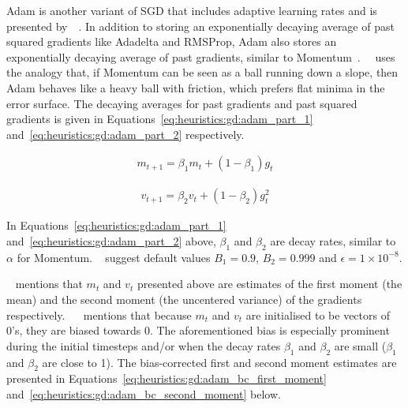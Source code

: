 \Acf{Adam} is another variant of \acs{SGD} that includes adaptive learning rates and is presented by~\citeauthor{ref:kingma:2014}~\cite{ref:kingma:2014}. In addition to storing an exponentially decaying average of past squared gradients like \acs{Adadelta} and \acs{RMSProp}, \acs{Adam} also stores an exponentially decaying average of past gradients, similar to \acs{Momentum}~\cite{ref:ruder:2016}.~\citeauthor{ref:heusel:2017}~\cite{ref:heusel:2017} uses the analogy that, if \acs{Momentum} can be seen as a ball running down a slope, then \acs{Adam} behaves like a heavy ball with friction, which prefers flat minima in the error surface. The decaying averages for past gradients and past squared gradients is given in Equations~\eqref{eq:heuristics:gd:adam_part_1} and~\eqref{eq:heuristics:gd:adam_part_2} respectively.

\begin{equation}
      \label{eq:heuristics:gd:adam_part_1}
      \begin{split}
            m_{t+1} = \beta_{1}m_{t} + (1 - \beta_{1})g_{t}
      \end{split}
\end{equation}

\begin{equation}
      \label{eq:heuristics:gd:adam_part_2}
      \begin{split}
            v_{t+1} = \beta_{2}v_{t} + (1 - \beta_{2})g^{2}_{t}
      \end{split}
\end{equation}

\noindent
In Equations~\eqref{eq:heuristics:gd:adam_part_1} and~\eqref{eq:heuristics:gd:adam_part_2} above, $\beta_{1}$ and $\beta_{2}$ are decay rates, similar to $\alpha$ for \acs{Momentum}. \citeauthor{ref:kingma:2014}~\cite{ref:kingma:2014} suggest default values $B_{1}=0.9$, $B_{2}=0.999$ and $\epsilon = 1 \times 10^{-8}$.

\citeauthor{ref:ruder:2016}~\cite{ref:ruder:2016} mentions that $m_{t}$ and $v_{t}$ presented above are estimates of the first moment (the mean) and the second moment (the uncentered variance) of the gradients respectively. ~\citeauthor{ref:kingma:2014}~\cite{ref:kingma:2014} mentions that because $m_{t}$ and $v_{t}$ are initialised to be vectors of 0's, they are biased towards 0. The aforementioned bias is especially prominent during the initial timesteps and/or when the decay rates $\beta_{1}$ and $\beta_{2}$ are small ($\beta_{1}$ and $\beta_{2}$ are close to 1). The bias-corrected first and second moment estimates are presented in Equations~\eqref{eq:heuristics:gd:adam_bc_first_moment} and~\eqref{eq:heuristics:gd:adam_bc_second_moment} below.

